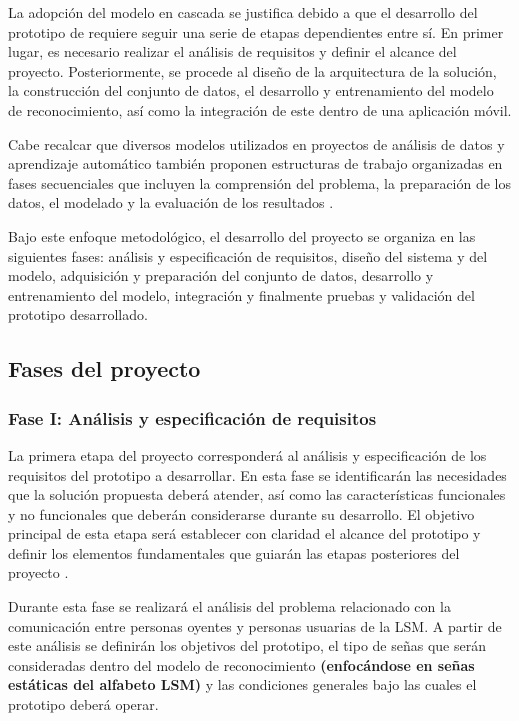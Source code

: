	La adopción del modelo en
	cascada se justifica debido a que el desarrollo del prototipo de  requiere seguir una serie de etapas dependientes entre sí. En primer
	lugar, es necesario realizar el análisis de requisitos y definir el alcance del
	proyecto. Posteriormente, se procede al diseño de la arquitectura de la solución,
	la construcción del conjunto de datos, el desarrollo y entrenamiento del modelo
	de reconocimiento, así como la integración de este dentro de una aplicación móvil.
	
	Cabe recalcar que diversos modelos utilizados en proyectos
	de análisis de datos y aprendizaje automático también proponen estructuras de
	trabajo organizadas en fases secuenciales que incluyen la comprensión del
	problema, la preparación de los datos, el modelado y la evaluación de los
	resultados \cite{crispdm2000}. 
	
	Bajo este enfoque metodológico, el desarrollo del proyecto se organiza en las
	siguientes fases: análisis y especificación de requisitos, diseño del sistema
	y del modelo, adquisición y preparación del conjunto de datos, desarrollo y
	entrenamiento del modelo, integración y finalmente pruebas y
	validación del prototipo desarrollado.
	
	\subsection{Fases del proyecto}
	
	\subsubsection{Fase I: Análisis y especificación de requisitos}
	
	La primera etapa del proyecto corresponderá al análisis y especificación de los
	requisitos del prototipo a desarrollar. En esta fase se identificarán las
	necesidades que la solución propuesta deberá atender, así como las
	características funcionales y no funcionales que deberán considerarse durante
	su desarrollo. El objetivo principal de esta etapa será establecer con claridad
	el alcance del prototipo y definir los elementos fundamentales que guiarán las
	etapas posteriores del proyecto \cite{pressman2014,sommerville2016}.
	
	Durante esta fase se realizará el análisis del problema relacionado con la
	comunicación entre personas oyentes y personas usuarias de la LSM. A partir de este análisis se definirán los objetivos del
	prototipo, el tipo de señas que serán consideradas dentro del modelo de
	reconocimiento \textbf{(enfocándose en señas estáticas del alfabeto LSM)} y las condiciones generales bajo las cuales el prototipo deberá
	operar.
	
